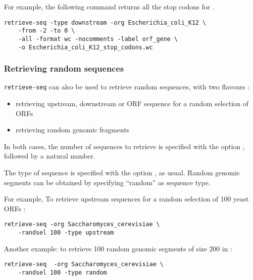 For example, the following command returns all the stop codons for
.

\begin{verbatim}
retrieve-seq -type downstream -org Escherichia_coli_K12 \
    -from -2 -to 0 \
    -all -format wc -nocomments -label orf_gene \
    -o Escherichia_coli_K12_stop_codons.wc
\end{verbatim}

\subsubsection{Retrieving random sequences}

\texttt{retrieve-seq} can also be used to retrieve random sequences,
with two flavours :

\begin{itemize}
\item retrieving upstream, downstream or ORF sequence for a random
selection of ORFs
\item retrieving random genomic fragments
\end{itemize}

In both cases, the number of sequences to retrieve is specified with
the option , followed by a natural number.

The type of sequence is specified with the option \option{-type}, as
usual. Random genomic segments can be obtained by specifying
``random'' as sequence type.

For example, To retrieve upstream sequences for a random selection of
100 yeast ORFs :
\begin{verbatim}
retrieve-seq -org Saccharomyces_cerevisiae \
    -randsel 100 -type upstream
\end{verbatim}

Another example: to retrieve 100 random genomic segments of size 200
in  :
\begin{verbatim}
retrieve-seq  -org Saccharomyces_cerevisiae \
    -randsel 100 -type random
\end{verbatim}


